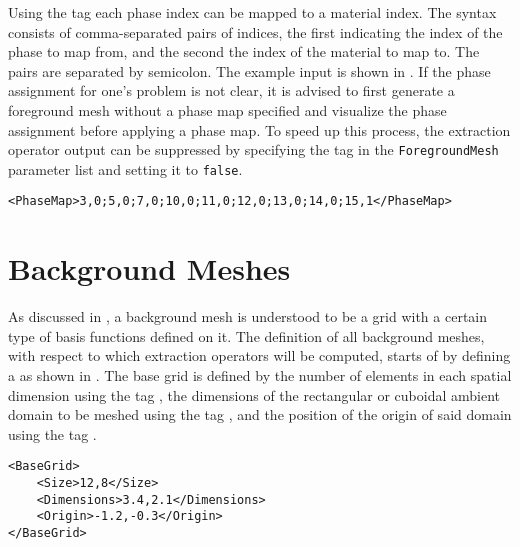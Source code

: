 Using the tag  each phase index can be mapped to a material index. The syntax consists of comma-separated pairs of indices, the first indicating the index of the phase to map from, and the second the index of the material to map to. The pairs are separated by semicolon. The example input is shown in . If the phase assignment for one's problem is not clear, it is advised to first generate a foreground mesh without a phase map specified and visualize the phase assignment before applying a phase map. To speed up this process, the extraction operator output can be suppressed by specifying the tag  in the \texttt{ForegroundMesh} parameter list and setting it to \texttt{false}.

\begin{minipage}{\linewidth}
\vspace{0.5cm}
\begin{lstlisting}[caption={Phase map for the material re-assignment shown in \Cref{fig:phase_assignment}},captionpos=b, label={lst:phase_map}]
<PhaseMap>3,0;5,0;7,0;10,0;11,0;12,0;13,0;14,0;15,1</PhaseMap>
\end{lstlisting}
\end{minipage}
    

\section{Background Meshes}
\label{sec:tutorial_background}

As discussed in , a background mesh is understood to be a grid with a certain type of basis functions defined on it. The definition of all background meshes, with respect to which extraction operators will be computed, starts of by defining a  as shown in . The base grid is defined by the number of elements in each spatial dimension using the tag , the dimensions of the rectangular or cuboidal ambient domain to be meshed using the tag , and the position of the origin of said domain using the tag .

\begin{minipage}{\linewidth}
\vspace{0.5cm}
\begin{lstlisting}[caption={Definition of a base grid},captionpos=b, label={lst:base_grid}]
<BaseGrid>
    <Size>12,8</Size>
    <Dimensions>3.4,2.1</Dimensions>
    <Origin>-1.2,-0.3</Origin>
</BaseGrid>
\end{lstlisting}
\end{minipage}

